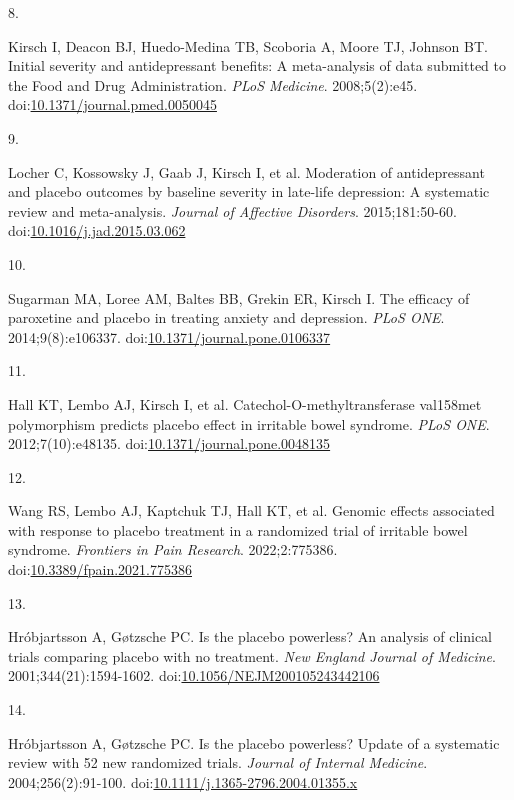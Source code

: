 \documentclass[
  11pt,
]{article}
\newlength{\cslhangindent}
\newlength{\csllabelwidth}
\newenvironment{CSLReferences}[2] %
 {\begin{list}{}{%
  \setlength{\itemindent}{0pt}
  \setlength{\leftmargin}{0pt}
  \setlength{\parsep}{0pt}
  \ifodd #1
   \setlength{\leftmargin}{\cslhangindent}
   \setlength{\itemindent}{-1\cslhangindent}
  \fi
  \setlength{\itemsep}{#2\baselineskip}}}
 {\end{list}}
\newcommand{\CSLLeftMargin}[1]{\parbox[t]{\csllabelwidth}{\strut#1\strut}}
\newcommand{\CSLRightInline}[1]{\parbox[t]{\linewidth - \csllabelwidth}{\strut#1\strut}}
\begin{document}
\begin{CSLReferences}{0}{1}
\CSLLeftMargin{8. }%
\CSLRightInline{Kirsch I, Deacon BJ, Huedo-Medina TB, Scoboria A, Moore TJ, Johnson BT. Initial severity and antidepressant benefits: A meta-analysis of data submitted to the {Food and Drug Administration}. \emph{PLoS Medicine}. 2008;5(2):e45. doi:\href{https://doi.org/10.1371/journal.pmed.0050045}{10.1371/journal.pmed.0050045}}

\CSLLeftMargin{9. }%
\CSLRightInline{{Locher C, Kossowsky J, Gaab J, Kirsch I, et al.} Moderation of antidepressant and placebo outcomes by baseline severity in late-life depression: A systematic review and meta-analysis. \emph{Journal of Affective Disorders}. 2015;181:50-60. doi:\href{https://doi.org/10.1016/j.jad.2015.03.062}{10.1016/j.jad.2015.03.062}}

\CSLLeftMargin{10. }%
\CSLRightInline{Sugarman MA, Loree AM, Baltes BB, Grekin ER, Kirsch I. The efficacy of paroxetine and placebo in treating anxiety and depression. \emph{PLoS ONE}. 2014;9(8):e106337. doi:\href{https://doi.org/10.1371/journal.pone.0106337}{10.1371/journal.pone.0106337}}

\CSLLeftMargin{11. }%
\CSLRightInline{Hall KT, Lembo AJ, Kirsch I, et al. Catechol-{O}-methyltransferase val158met polymorphism predicts placebo effect in irritable bowel syndrome. \emph{PLoS ONE}. 2012;7(10):e48135. doi:\href{https://doi.org/10.1371/journal.pone.0048135}{10.1371/journal.pone.0048135}}

\CSLLeftMargin{12. }%
\CSLRightInline{{Wang RS, Lembo AJ, Kaptchuk TJ, Hall KT, et al.} Genomic effects associated with response to placebo treatment in a randomized trial of irritable bowel syndrome. \emph{Frontiers in Pain Research}. 2022;2:775386. doi:\href{https://doi.org/10.3389/fpain.2021.775386}{10.3389/fpain.2021.775386}}

\CSLLeftMargin{13. }%
\CSLRightInline{Hróbjartsson A, Gøtzsche PC. Is the placebo powerless? An analysis of clinical trials comparing placebo with no treatment. \emph{New England Journal of Medicine}. 2001;344(21):1594-1602. doi:\href{https://doi.org/10.1056/NEJM200105243442106}{10.1056/NEJM200105243442106}}

\CSLLeftMargin{14. }%
\CSLRightInline{Hróbjartsson A, Gøtzsche PC. Is the placebo powerless? Update of a systematic review with 52 new randomized trials. \emph{Journal of Internal Medicine}. 2004;256(2):91-100. doi:\href{https://doi.org/10.1111/j.1365-2796.2004.01355.x}{10.1111/j.1365-2796.2004.01355.x}}


\end{CSLReferences}
\end{document}
